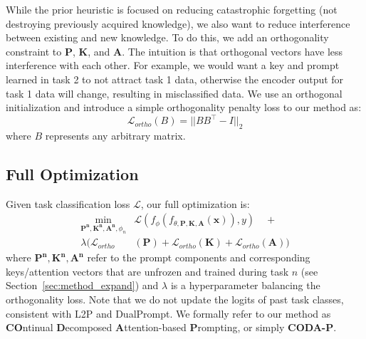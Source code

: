 While the prior heuristic is focused on reducing catastrophic forgetting (not destroying previously acquired knowledge), we also want to reduce interference between existing and new knowledge. To do this, we add an orthogonality constraint to $\bm{P}$, $\bm{K}$, and $\bm{A}$. The intuition is that orthogonal vectors have less interference with each other. For example, we would want a key and prompt learned in task 2 to not attract task 1 data, otherwise the encoder output for task 1 data will change, resulting in misclassified data. We use an orthogonal initialization and introduce a simple orthogonality penalty loss to our method as:
\begin{equation}
\mathcal{L}_{ortho}(B) = ||B B^\top - I||_2
\label{eq:ortho}
\end{equation}
where $B$ represents any arbitrary matrix.


\subsection{Full Optimization}

Given task classification loss $\mathcal{L}$, our full optimization is:
\begin{equation} \label{eq:full_loss}
\begin{aligned}
    \underset{\bm{P^n}, \bm{K^n}, \bm{A^n}, \phi_{n}}{\operatorname{min}}  &\mathcal{L}(f_\phi(f_{\theta,\bm{P},\bm{K},\bm{A}}(\bm{x})), y) \quad + \\
    \lambda (\mathcal{L}_{ortho} &\left( \bm{P} \right) + \mathcal{L}_{ortho}\left( \bm{K} \right) + \mathcal{L}_{ortho}\left( \bm{A} \right) )
\end{aligned}
\end{equation}
where $\bm{P^n}, \bm{K^n}, \bm{A^n}$ refer to the prompt components and corresponding keys/attention vectors that are unfrozen and trained during task $n$ (see Section~\ref{sec:method_expand}) and $\lambda$ is a hyperparameter balancing the orthogonality loss. Note that we do not update the logits of past task classes, consistent with L2P and DualPrompt. We formally refer to our method as \textbf{CO}ntinual \textbf{D}ecomposed \textbf{A}ttention-based \textbf{P}rompting, or simply \textbf{CODA-P}.


